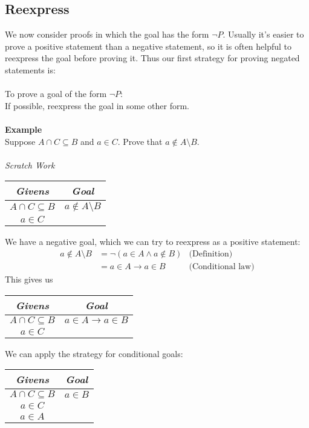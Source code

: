 \documentclass{report}
\theoremstyle{definition}
\begin{document}
\subsection{Reexpress}
We now consider proofs in which the goal has the form $\neg P$. Usually it's easier to prove a positive statement than a negative statement, so it is often helpful to reexpress the goal before
proving it. Thus our first strategy for proving negated statements is:\\
\vspace{1mm}\\
\indent To prove a goal of the form $\neg P$:\\
\indent If possible, reexpress the goal in some other form.\\
\vspace{1mm}\\
\textbf{Example}\\
Suppose $A\cap C\subseteq B$ and $a\in C$. Prove that $a\notin A\setminus B$.\\
\vspace{1mm}\\
\textit{Scratch Work}
\begin{center}
\begin{tabular}{c|c}
\textit{Givens}&\textit{Goal}\\
\hline
$A\cap C\subseteq B$&$a\notin A\setminus B$\\
$a\in C$&
\end{tabular}
\end{center}
We have a negative goal, which we can try to reexpress as a positive statement:
\begin{align*}
a\notin A\setminus B&=\neg(a\in A\land a\notin B)&\text{(Definition)}\\
&=a\in A\to a\in B&\text{(Conditional law)}
\end{align*}
This gives us
\begin{center}
\begin{tabular}{c|c}
\textit{Givens}&\textit{Goal}\\
\hline
$A\cap C\subseteq B$&$a\in A\to a\in B$\\
$a\in C$&
\end{tabular}
\end{center}
We can apply the strategy for conditional goals:
\begin{center}
\begin{tabular}{c|c}
\textit{Givens}&\textit{Goal}\\
\hline
$A\cap C\subseteq B$&$a\in B$\\
$a\in C$&\\
$a\in A$&
\end{tabular}
\end{center}
\end{document}
